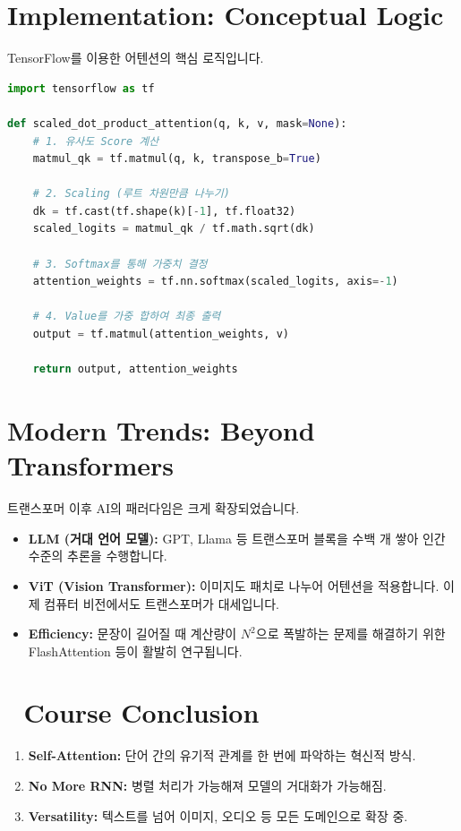 \documentclass[11pt,a4paper]{book}
\theoremstyle{definition}
\begin{document}
\section{Implementation: Conceptual Logic}

TensorFlow를 이용한 어텐션의 핵심 로직입니다.

\begin{lstlisting}[language=Python, caption=Scaled Dot-Product Attention, breaklines=true]
import tensorflow as tf

def scaled_dot_product_attention(q, k, v, mask=None):
    # 1. 유사도 Score 계산
    matmul_qk = tf.matmul(q, k, transpose_b=True)

    # 2. Scaling (루트 차원만큼 나누기)
    dk = tf.cast(tf.shape(k)[-1], tf.float32)
    scaled_logits = matmul_qk / tf.math.sqrt(dk)

    # 3. Softmax를 통해 가중치 결정
    attention_weights = tf.nn.softmax(scaled_logits, axis=-1)

    # 4. Value를 가중 합하여 최종 출력
    output = tf.matmul(attention_weights, v)

    return output, attention_weights
\end{lstlisting}

\section{Modern Trends: Beyond Transformers}

트랜스포머 이후 AI의 패러다임은 크게 확장되었습니다.

\begin{itemize}
    \item \textbf{LLM (거대 언어 모델):} GPT, Llama 등 트랜스포머 블록을 수백 개 쌓아 인간 수준의 추론을 수행합니다.
    \item \textbf{ViT (Vision Transformer):} 이미지도 패치로 나누어 어텐션을 적용합니다. 이제 컴퓨터 비전에서도 트랜스포머가 대세입니다.
    \item \textbf{Efficiency:} 문장이 길어질 때 계산량이 $N^2$으로 폭발하는 문제를 해결하기 위한 FlashAttention 등이 활발히 연구됩니다.
\end{itemize}


\section*{🏁 Course Conclusion}
\begin{summarybox}[title={최종 요약}]
\begin{enumerate}
    \item \textbf{Self-Attention:} 단어 간의 유기적 관계를 한 번에 파악하는 혁신적 방식.
    \item \textbf{No More RNN:} 병렬 처리가 가능해져 모델의 거대화가 가능해짐.
    \item \textbf{Versatility:} 텍스트를 넘어 이미지, 오디오 등 모든 도메인으로 확장 중.
\end{enumerate}
\end{summarybox}
\end{document}
